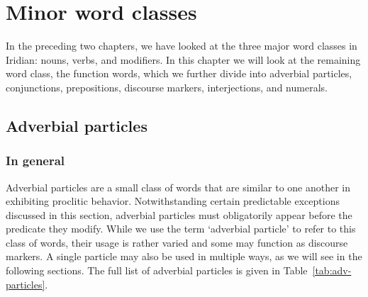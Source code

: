 \chapter{Minor word classes}\label{chap:minor}

In the preceding two chapters, we have looked at the three major word classes in Iridian: nouns, verbs, and modifiers. In this chapter we will look at the remaining word class, the function words, which we further divide into adverbial particles, conjunctions, prepositions, discourse markers, interjections, and numerals.

\section{Adverbial particles}\label{sec:adv-particles}

\subsection{In general}\label{sec:adv-particles-general}

Adverbial particles are a small class of words that are similar to one another
in exhibiting proclitic behavior. Notwithstanding certain predictable exceptions
discussed in this section, adverbial particles must obligatorily appear before
the predicate they modify. While we use the term `adverbial particle' to refer
to this class of words, their usage is rather varied and some may function as
discourse markers. A single particle may also be used in multiple ways, as we
will see in the following sections. The full list of adverbial particles is
given in Table~\ref{tab:adv-particles}.


